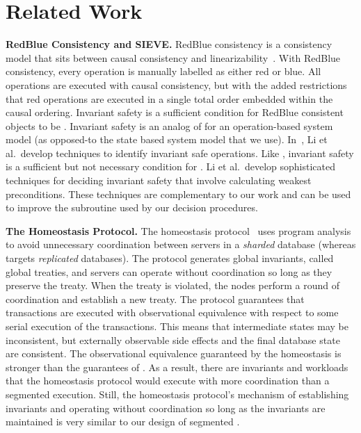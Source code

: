 \section{Related Work}

\newcommand{\sieve}{\textsc{SIEVE}}
\textbf{RedBlue Consistency and \sieve.}
RedBlue consistency is a consistency model that sits between causal consistency
and linearizability~\cite{li2012making}.
%
With RedBlue consistency, every operation is manually labelled as either red or
blue. All operations are executed with causal consistency, but with the added
restrictions that red operations are executed in a single total order embedded
within the causal ordering.
%
Invariant safety is a sufficient condition for RedBlue consistent objects to be
\invariantconfluent{}. Invariant safety is an analog of \invariantclosure{} for an
operation-based system model (as opposed-to the state based system model that
we use). In~\cite{li2014automating}, Li et al.\ develop techniques to identify
invariant safe operations. Like \invariantclosure{}, invariant safety is a
sufficient but not necessary condition for \invariantconfluence{}. Li et al.\
develop sophisticated techniques for deciding invariant safety that involve
calculating weakest preconditions. These techniques are complementary to our
work and can be used to improve the \invariantclosure{} subroutine used by our
decision procedures.

\textbf{The Homeostasis Protocol.}
The homeostasis protocol~\cite{roy2015homeostasis} uses program analysis to
avoid unnecessary coordination between servers in a \emph{sharded} database
(whereas \invariantconfluence{} targets \emph{replicated} databases). The
protocol generates global invariants, called global treaties, and servers can
operate without coordination so long as they preserve the treaty. When the
treaty is violated, the nodes perform a round of coordination and establish a
new treaty. The protocol guarantees that transactions are executed with
observational equivalence with respect to some serial execution of the
transactions. This means that intermediate states may be inconsistent, but
externally observable side effects and the final database state are consistent.
The observational equivalence guaranteed by the homeostasis is stronger than
the guarantees of \invariantconfluence{}. As a result, there are invariants and
workloads that the homeostasis protocol would execute with more coordination
than a segmented \invariantconfluent{} execution. Still, the homeostasis
protocol's mechanism of establishing invariants and operating without
coordination so long as the invariants are maintained is very similar to our
design of segmented \invariantconfluence{}.


